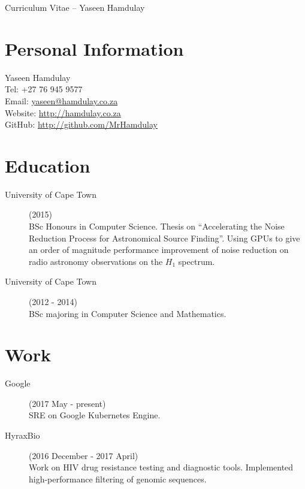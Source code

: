 \documentclass[margin,line,a4paper]{resume}
\begin{document}
    {\sc \Large Curriculum Vitae -- Yaseen Hamdulay}
    \begin{resume}
        \vspace{0.5cm}

        \section{\mysidestyle Personal Information}
            Yaseen Hamdulay\\
            Tel: +27 76 945 9577\\
            Email: \href{mailto:yaseen@hamdulay.co.za}{yaseen@hamdulay.co.za}\\
            Website: \href{http://hamdulay.co.za}{http://hamdulay.co.za}\\
            GitHub: \href{http://github.com/MrHamdulay}{http://github.com/MrHamdulay}\\

        \section{\mysidestyle Education}
            \begin{description}
                \item[University of Cape Town] (2015) \\
                    BSc Honours in Computer Science. Thesis on ``Accelerating the Noise Reduction Process for Astronomical Source Finding''.
                    Using GPUs to give an order of magnitude performance improvement of noise reduction on radio astronomy observations on the $H_1$ spectrum.

                \item[University of Cape Town] (2012 - 2014) \\
                    BSc majoring in Computer Science and Mathematics.
            \end{description}


        \section{\mysidestyle Work}
            \begin{description}
            
              \item[Google] (2017 May - present) \\
                SRE on Google Kubernetes Engine.

              \item[HyraxBio] (2016 December - 2017 April) \\
                Work on HIV drug resistance testing and diagnostic tools. Implemented high-performance filtering of genomic sequences. 
                

\end{description}
\end{resume}
\end{document}

